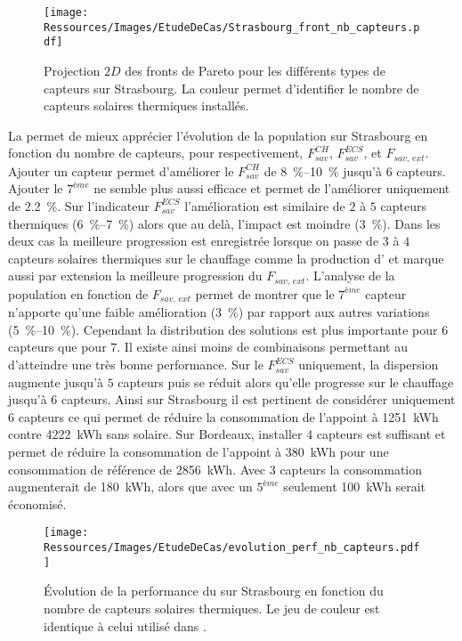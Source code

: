 \begin{figure}
    \centering
    \texttt{[image: Ressources/Images/EtudeDeCas/Strasbourg\_front\_nb\_capteurs.pdf]}
    \caption[Fronts de Pareto pour les différents types de capteurs sur Strasbourg]
             {Projection $2D$ des fronts de Pareto pour les différents types de capteurs sur Strasbourg.
             La couleur permet d’identifier le nombre de capteurs solaires thermiques installés.}
    \label{fig:front_pareto_nb_th}
\end{figure}


La  permet de mieux apprécier l’évolution de la
population sur Strasbourg en fonction du nombre de capteurs, pour respectivement, $F_{sav}^{CH}$,
$F_{sav}^{ECS}$, et $F_{sav,\, ext}$. Ajouter un capteur permet d’améliorer le
$F_{sav}^{CH}$ de \SIrange{8}{10}{\percent} jusqu’à $6$ capteurs. Ajouter le $7^{ème}$ ne
semble plus aussi efficace et permet de l’améliorer uniquement de \SI{2.2}{\percent}. Sur
l’indicateur $F_{sav}^{ECS}$ l’amélioration est similaire de $2$ à $5$ capteurs thermiques
(\SIrange{6}{7}{\percent}) alors que au delà, l’impact est moindre (\SI{3}{\percent}).
Dans les deux cas la meilleure progression est enregistrée lorsque on passe de $3$ à $4$
capteurs solaires thermiques sur le chauffage comme la production d’ et marque
aussi par extension la meilleure progression du $F_{sav,\, ext}$. L’analyse de la
population en fonction de $F_{sav,\, ext}$ permet de montrer que le $7^{ème}$ capteur
n’apporte qu’une faible amélioration (\SI{3}{\percent}) par rapport aux autres variations
(\SIrange{5}{10}{\percent}). Cependant la distribution des solutions est plus importante
pour $6$ capteurs que pour $7$. Il existe ainsi moins de combinaisons permettant au
 d’atteindre une très bonne performance. Sur le $F_{sav}^{ECS}$ uniquement, la
dispersion augmente jusqu’à $5$ capteurs puis se réduit alors qu’elle progresse sur le
chauffage jusqu’à $6$ capteurs. Ainsi sur Strasbourg il est pertinent de considérer
uniquement $6$ capteurs ce qui permet de réduire la consommation de l’appoint à
\SI{1251}{kWh} contre \SI{4222}{kWh} sans solaire. Sur Bordeaux, installer $4$ capteurs
est suffisant et permet de réduire la consommation de l’appoint à \SI{380}{kWh} pour une
consommation de référence de \SI{2856}{kWh}. Avec $3$ capteurs la consommation
augmenterait de \SI{180}{kWh}, alors que avec un $5^{ème}$ seulement \SI{100}{kWh} serait
économisé.

\begin{figure}
    \centering
    \texttt{[image: Ressources/Images/EtudeDeCas/evolution\_perf\_nb\_capteurs.pdf]}
    \caption[Performance du  sur Strasbourg en fonction du nombre de capteurs solaires thermiques]
             {Évolution de la performance du  sur Strasbourg en fonction du nombre de capteurs solaires thermiques.
              Le jeu de couleur est identique à celui utilisé dans .}
    \label{fig:perf_nb_th}
\end{figure}


